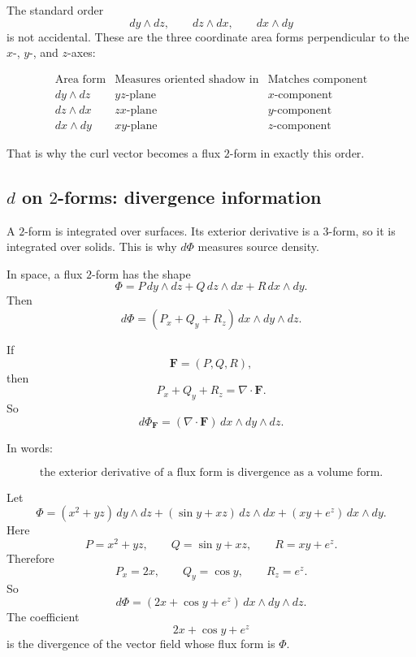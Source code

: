 The standard order
\[
    dy\wedge dz,\qquad dz\wedge dx,\qquad dx\wedge dy
\]
is not accidental.  These are the three coordinate area forms perpendicular to the
\(x\)-, \(y\)-, and \(z\)-axes:

\[
\begin{array}{c|c|c}
\text{Area form} & \text{Measures oriented shadow in} & \text{Matches component} \\ \hline
dy\wedge dz & yz\text{-plane} & x\text{-component}\\[1mm]
dz\wedge dx & zx\text{-plane} & y\text{-component}\\[1mm]
dx\wedge dy & xy\text{-plane} & z\text{-component}
\end{array}
\]

That is why the curl vector becomes a flux \(2\)-form in exactly this order.

\subsection{\texorpdfstring{\(d\)}{d} on \texorpdfstring{\(2\)}{2}-forms:
divergence information}

A \(2\)-form is integrated over surfaces.  Its exterior derivative is a \(3\)-form, so it
is integrated over solids.  This is why \(d\Phi\) measures source density.

In space, a flux \(2\)-form has the shape
\[
    \Phi
    =
    P\,dy\wedge dz
    +
    Q\,dz\wedge dx
    +
    R\,dx\wedge dy.
\]
Then
\[
\boxed{
    d\Phi
    =
    (P_x+Q_y+R_z)\,dx\wedge dy\wedge dz.
}
\]

If
\[
    \mathbf F=(P,Q,R),
\]
then
\[
    P_x+Q_y+R_z=\nabla\cdot\mathbf F.
\]
So
\[
\boxed{
    d\Phi_{\mathbf F}
    =
    (\nabla\cdot\mathbf F)\,dx\wedge dy\wedge dz.
}
\]

In words:

\[
\boxed{
    \text{the exterior derivative of a flux form is divergence as a volume form.}
}
\]

\begin{example}
Let
\[
    \Phi
    =
    (x^2+yz)\,dy\wedge dz
    +
    (\sin y+xz)\,dz\wedge dx
    +
    (xy+e^z)\,dx\wedge dy.
\]
Here
\[
    P=x^2+yz,
    \qquad
    Q=\sin y+xz,
    \qquad
    R=xy+e^z.
\]
Therefore
\[
    P_x=2x,
    \qquad
    Q_y=\cos y,
    \qquad
    R_z=e^z.
\]
So
\[
\boxed{
    d\Phi=(2x+\cos y+e^z)\,dx\wedge dy\wedge dz.
}
\]
The coefficient
\[
    2x+\cos y+e^z
\]
is the divergence of the vector field whose flux form is \(\Phi\).
\end{example}

